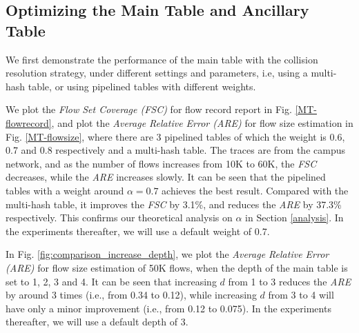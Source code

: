 \subsection{Optimizing the Main Table and Ancillary Table }
We first demonstrate the performance of the main table with the collision resolution strategy, 
under different settings and parameters, i.e, using a multi-hash table, 
or using pipelined tables with different weights.

We plot the \emph{Flow Set Coverage (FSC)} for flow record report in Fig. \ref{MT-flowrecord},
and plot the \emph{Average Relative Error (ARE)} for flow size estimation in Fig. \ref{MT-flowsize}, 
where there are 3 pipelined tables of which the weight is 0.6, 0.7 and 0.8 respectively and a multi-hash table. 
The traces are from  the campus network, and as the number of flows increases from 10K to 60K, 
the \emph{FSC} decreases, while the \emph{ARE} increases slowly.
It can be seen that the pipelined tables with a weight around $\alpha=0.7$ achieves the best result.
Compared with the multi-hash table, it improves the \emph{FSC} by 3.1\%, 
and reduces the \emph{ARE} by 37.3\% respectively. 
This confirms our theoretical analysis on $\alpha$ in Section \ref{analysis}.
In the experiments thereafter, we will use a default weight of 0.7.


In Fig. \ref{fig:comparison_increase_depth}, we plot the \emph{Average Relative Error (ARE)} 
for flow size estimation of 50K flows, when the depth of the main table is set to 1, 2, 3 and 4.
It can be seen that increasing $d$ from 1 to 3 reduces the \emph{ARE} by around 3 times (i.e., from 0.34 to 0.12), 
while increasing $d$ from 3 to 4 will have only a minor improvement (i.e., from 0.12 to 0.075). 
In the experiments thereafter, we will use a default depth of 3.




